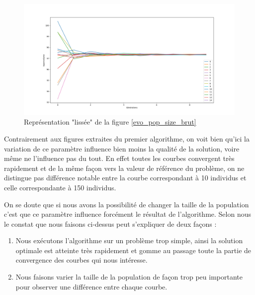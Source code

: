 \documentclass[12pt]{report}
\begin{document}
      \begin{figure}[!]
        \centering
        \includegraphics[width=18cm]{img/pop_size_sch_liss.png}
        \caption{Représentation "lissée" de la figure \ref{evo_pop_size_brut}}
        \label{sch_pop_size_liss}
      \end{figure}


      Contrairement aux figures extraites du premier algorithme, on voit bien qu'ici la variation de ce paramètre influence bien moins la qualité de la solution, voire même ne l'influence pas du tout. En effet toutes les courbes convergent très rapidement et de la même façon vers la valeur de référence du problème, on ne distingue pas différence notable entre la courbe correspondant à 10 individus et celle correspondante à 150 individus.

      On se doute que si nous avons la possibilité de changer la taille de la population c'est que ce paramètre influence forcément le résultat de l'algorithme. Selon nous le constat que nous faisons ci-dessus peut s'expliquer de deux façons :
      \begin{enumerate}
        \item Nous exécutons l'algorithme sur un problème trop simple, ainsi la solution optimale est atteinte très rapidement et gomme au passage toute la partie de convergence des courbes qui nous intéresse.
        \item Nous faisons varier la taille de la population de façon trop peu importante pour observer une différence entre chaque courbe.
      \end{enumerate}
\end{document}
